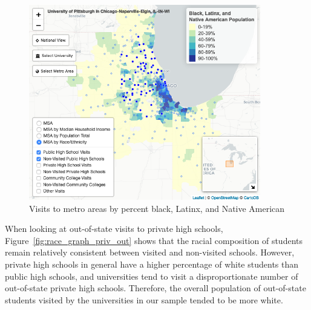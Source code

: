 \documentclass{article}
\begin{document}
\begin{figure}[!ht]
    \centering
    \includegraphics[width=0.9\textwidth]{assets/maps/race_map.png}
    \caption{Visits to metro areas by percent black, Latinx, and Native American}
    \label{fig:race_map}
\end{figure}

When looking at out-of-state visits to private high schools, Figure~\ref{fig:race_graph_priv_out} shows that the racial composition of students remain relatively consistent between visited and non-visited schools. However, private high schools in general have a higher percentage of white students than public high schools, and universities tend to visit a disproportionate number of out-of-state private high schools. Therefore, the overall population of out-of-state students visited by the universities in our sample tended to be more white. 
\end{document}
